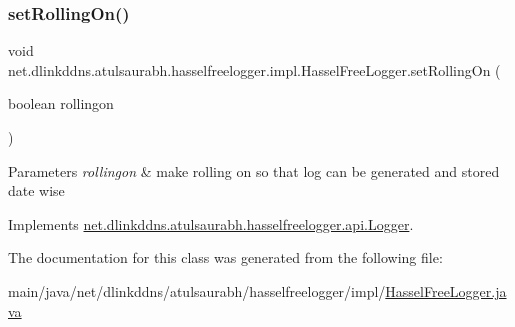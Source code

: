 \subsubsection{\texorpdfstring{set\+Rolling\+On()}{setRollingOn()}}
{\footnotesize\ttfamily void net.\+dlinkddns.\+atulsaurabh.\+hasselfreelogger.\+impl.\+Hassel\+Free\+Logger.\+set\+Rolling\+On (\begin{DoxyParamCaption}\item[{boolean}]{rollingon }\end{DoxyParamCaption})}


\begin{DoxyParams}{Parameters}
{\em rollingon} & make rolling on so that log can be generated and stored date wise \\
\hline
\end{DoxyParams}


Implements \mbox{\hyperlink{interfacenet_1_1dlinkddns_1_1atulsaurabh_1_1hasselfreelogger_1_1api_1_1_logger_a2f15f4d94258528efb2938323deb8135}{net.\+dlinkddns.\+atulsaurabh.\+hasselfreelogger.\+api.\+Logger}}.



The documentation for this class was generated from the following file\+:\begin{DoxyCompactItemize}
\item 
main/java/net/dlinkddns/atulsaurabh/hasselfreelogger/impl/\mbox{\hyperlink{_hassel_free_logger_8java}{Hassel\+Free\+Logger.\+java}}\end{DoxyCompactItemize}
